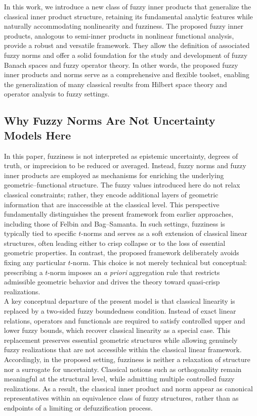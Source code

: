 \documentclass[preprint,12pt]{elsarticle}
\theoremstyle{definition}
\begin{document}
	In this work, we introduce a new class of fuzzy inner products that generalize the classical inner product structure, retaining its fundamental analytic features while naturally accommodating nonlinearity and fuzziness.  The proposed fuzzy inner products, analogous to semi-inner products in nonlinear functional analysis, 
	provide a robust and versatile framework. They allow the definition of associated fuzzy norms and 
	offer a solid foundation for the study and development of fuzzy Banach spaces and fuzzy operator theory. 
	In other words, the proposed fuzzy inner products and norms serve as a comprehensive and flexible toolset, 
	enabling the generalization of many classical results from Hilbert space theory and operator analysis 
	to fuzzy settings.
\subsection*{Why Fuzzy Norms Are Not Uncertainty Models Here}
In this paper, fuzziness is not interpreted as epistemic uncertainty, degrees of truth, or imprecision to be reduced or averaged. Instead, fuzzy norms and fuzzy inner products are employed as mechanisms for enriching the underlying geometric--functional structure. The fuzzy values introduced here do not relax classical constraints; rather, they encode additional layers of geometric information that are inaccessible at the classical level.
This perspective fundamentally distinguishes the present framework from earlier approaches, including those of Felbin and Bag--Samanta. In such settings, fuzziness is typically tied to specific $t$-norms and serves as a soft extension of classical linear structures, often leading either to crisp collapse or to the loss of essential geometric properties. In contrast, the proposed framework deliberately avoids fixing any particular $t$-norm. This choice is not merely technical but conceptual: prescribing a $t$-norm imposes an \emph{a priori} aggregation rule that restricts admissible geometric behavior and drives the theory toward quasi-crisp realizations.\\
A key conceptual departure of the present model is that classical linearity is replaced by a two-sided fuzzy boundedness condition. Instead of exact linear relations, operators and functionals are required to satisfy controlled upper and lower fuzzy bounds, which recover classical linearity as a special case. This replacement preserves essential geometric structures while allowing genuinely fuzzy realizations that are not accessible within the classical linear framework.\\
Accordingly, in the proposed setting, fuzziness is neither a relaxation of structure nor a surrogate for uncertainty. Classical notions such as orthogonality remain meaningful at the structural level, while admitting multiple controlled fuzzy realizations. As a result, the classical inner product and norm appear as canonical representatives within an equivalence class of fuzzy structures, rather than as endpoints of a limiting or defuzzification process.
\end{document}
